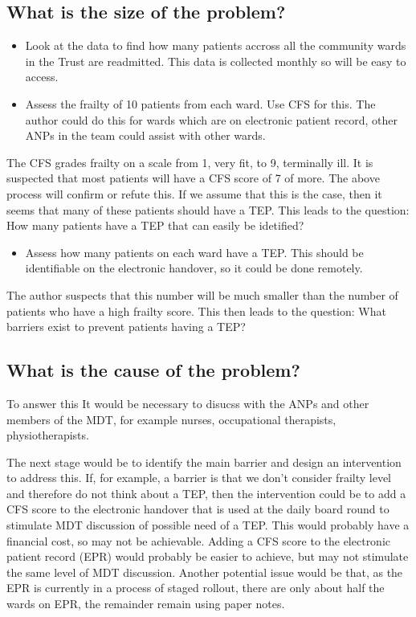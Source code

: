 \documentclass[12pt,a4paper,oneside,titlepage]{article}
\begin{document}
\subsection*{What is the size of the problem?}

\begin{itemize}
\item Look at the data to find how many patients accross all the community wards in the
    Trust are readmitted. This data is collected monthly so will be easy to access.
\item Assess the frailty of 10 patients from each ward. Use CFS for this.
	The author could do this for wards which are on electronic patient record, other ANPs
	in the team could assist with other wards.
\end{itemize}

The CFS grades frailty on a scale from 1, very fit, to 9, terminally ill.
It is suspected that most patients will have a CFS score of 7 of more. The above process 
will confirm or refute this. If we assume that this is the case, then it seems
that many of these patients should have a TEP. This leads to the question: 
How many patients have a TEP that can easily be idetified?

\begin{itemize}

\item Assess how many patients on each ward have a TEP. This should be identifiable on 
	the electronic handover, so it could be done remotely.
\end{itemize}

The author suspects that this number will be much smaller than the number of patients 
who have a high frailty score. This then leads to the question: 
What barriers exist to prevent patients having a TEP?

\subsection*{What is the cause of the problem?}
To answer this It would be necessary to disucss with the ANPs and other members of
the MDT, for example nurses, occupational therapists, physiotherapists.

The next stage would be to identify the main barrier and design an intervention to
address this. If, for example, a barrier is that we don't consider frailty level and
therefore do not think about a TEP, then the intervention could be to add a CFS score
to the electronic handover that is used at the daily board round to stimulate MDT
discussion of possible need of a TEP. This would probably have a financial cost, so
may not be achievable. Adding a CFS score to the electronic patient record (EPR) would 
probably be easier to achieve, but may not stimulate the same level of MDT discussion.
Another potential issue would be that, as the EPR is currently in a process of staged 
rollout, there are only about half the wards on EPR, the remainder remain using paper notes.
\end{document}
